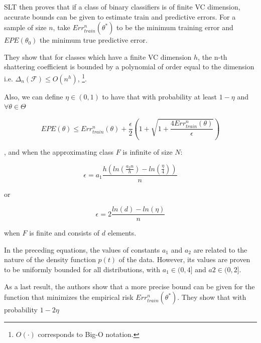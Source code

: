 SLT then proves that if a class of binary classifiers is of finite VC dimension, accurate bounds can be given to estimate train and predictive errors. For a sample of size $n$, take $Err^n_{train}(\theta^*)$ to be the minimum training error and $EPE(\theta_0)$ the minimum true predictive error.


They show that for classes which have a finite VC dimension $h$, the n-th shattering coefficient is bounded by a polynomial of order equal to the dimension
i.e. $\Delta_n(\mathcal {F}) \leq O(n^{h})$, \footnote{$O(\cdot)$ corresponds to Big-O notation.}.


  
Also, we can define $\eta \in (0,1)$ to have that with probability at least $1 - \eta$ and $\forall \theta \in \Theta$

\begin{equation}
EPE(\theta) \leq Err^n_{train}(\theta) + \frac{\epsilon}{2} \left(1 + \sqrt{1 + \frac{4 Err^n_{train}(\theta) }{\epsilon}} \right)
\end{equation} \label{eq:vapnik-classificationBound}

, and when the approximating class $F$ is infinite of size $N$:

\begin{equation}
\epsilon = a_1 \frac{h \left( ln(\frac{a_2 n}{h} ) - ln(\frac{\eta}{4} ) \right)}{n}
\end{equation} \label{eq:vapnik-epsilonBound}

or

\begin{equation}
\epsilon = 2 \frac{ ln(d) - ln(\eta)}{n}
\end{equation} \label{eq:vapnik-epsilonBoundSimple}

when $F$ is finite and consists of $d$ elements.

In the preceding equations, the values of constants $a_1$ and $a_2$ are related to the nature of the density function $p(t)$ of the data. However, its values are proven to be uniformly bounded for all distributions, with $a_1 \in (0,4 ]$ and $a2 \in (0,2 ]$.

As a last result, the authors show that a more precise bound can be given for the function that minimizes the empirical risk $Err^n_{train}(\theta^*)$. They show that with probability $1 - 2\eta$


